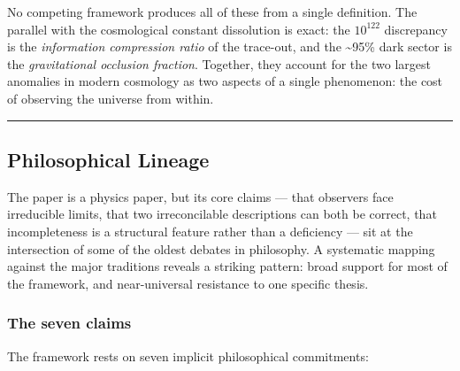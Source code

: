 \documentclass[
]{article}
\begin{document}
No competing framework produces all of these from a single definition.
The parallel with the cosmological constant dissolution is exact: the
\(10^{122}\) discrepancy is the \emph{information compression ratio} of
the trace-out, and the \textasciitilde95\% dark sector is the
\emph{gravitational occlusion fraction}. Together, they account for the
two largest anomalies in modern cosmology as two aspects of a single
phenomenon: the cost of observing the universe from within.

\begin{center}\rule{0.5\linewidth}{0.5pt}\end{center}

\hypertarget{philosophical-lineage}{%
\subsection{Philosophical Lineage}\label{philosophical-lineage}}

The paper is a physics paper, but its core claims --- that observers
face irreducible limits, that two irreconcilable descriptions can both
be correct, that incompleteness is a structural feature rather than a
deficiency --- sit at the intersection of some of the oldest debates in
philosophy. A systematic mapping against the major traditions reveals a
striking pattern: broad support for most of the framework, and
near-universal resistance to one specific thesis.

\hypertarget{the-seven-claims}{%
\subsubsection{The seven claims}\label{the-seven-claims}}

The framework rests on seven implicit philosophical commitments:
\end{document}
